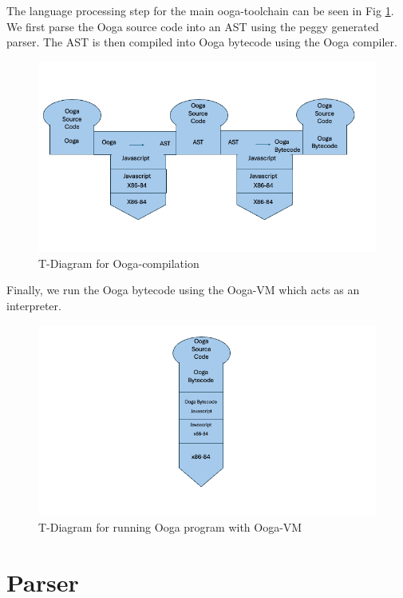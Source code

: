 \documentclass{report}
\begin{document}
The language processing step for the main ooga-toolchain can be seen in Fig \ref{fig:ooga-toolchain}. We first parse the Ooga source code into an AST using the peggy generated parser. The AST is then compiled into Ooga bytecode using the Ooga compiler.

\begin{figure}
    \centering
    \includegraphics[width=1.25\linewidth]{ooga-compilation-t-diagram.png}
    \caption{T-Diagram for Ooga-compilation}
    \label{fig:ooga-toolchain}
\end{figure}

Finally, we run the Ooga bytecode using the Ooga-VM which acts as an interpreter.

\begin{figure}
    \centering
    \includegraphics[width=1.3\linewidth]{ooga-vm-t-diagram.png}
    \caption{T-Diagram for running Ooga program with Ooga-VM}
    \label{fig:ooga-vm}
\end{figure}

\section{Parser}
\end{document}
